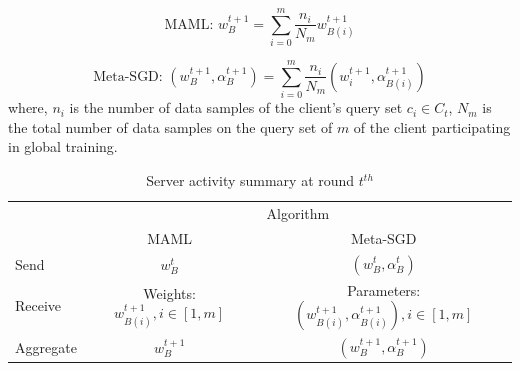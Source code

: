 \documentclass[runningheads]{llncs}
\begin{document}
\begin{dmath}
    \text{MAML: } w_{B}^{t+1} = \sum_{i=0}^m \frac{n_i}{N_m} w_{B(i)}^{t+1}
\end{dmath}

\begin{dmath}
    \text{Meta-SGD: } (w_B^{t+1}, \alpha_B^{t+1}) = \sum_{i=0}^m \frac{n_i}{N_m} (w_i^{t+1}, \alpha_{B(i)}^{t+1})
\end{dmath} where, $n_i$ is the number of data samples of the client's query set $c_i\in C_t$, $N_m$ is the total number of data samples on the query set of $m$ of the client participating in global training.

\begin{table}[h]
    \centering
    \caption{Server activity summary at round $t^{th}$}
    \label{tab:param_fedmetaper}
    \begin{tabular}{l|c|c} 
    \toprule
    \multirow{2}{*}{} & \multicolumn{2}{c}{Algorithm}                                               \\ 
    \cline{2-3}
                      & MAML                          & Meta-SGD                                     \\ 
    \hline
    Send              & $w_B^t$                                & $(w_B^t, \alpha_B^t)$                        \\
    Receive           & Weights: $w_{B(i)}^{t+1}, i\in [1,m]$  & Parameters: $(w_{B(i)}^{t+1}, \alpha_{B(i)}^{t+1}), i\in [1,m]$  \\
    Aggregate         & $w_{B}^{t+1}$                          & $(w_B^{t+1}, \alpha_B^{t+1})$                    \\
    \bottomrule
    \end{tabular}
\end{table}
\end{document}
